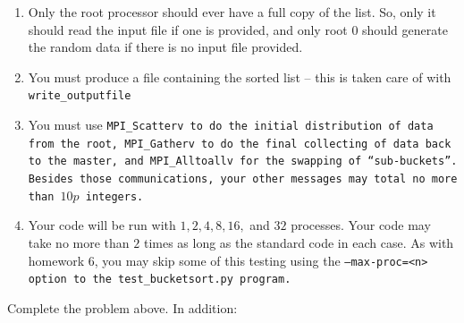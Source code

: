\documentclass{article}
\begin{document}
\begin{enumerate}
\begin{enumerate}
\item Only the root processor should ever have a full copy of the
  list.  So, only it should read the input file if one is provided,
  and only root 0 should generate the random data if there is no input
  file provided. 
\item You must produce a file containing the sorted list -- this is
  taken care of with \tt{write\_outputfile}

\item You must use \tt{MPI\_Scatterv} to do the initial distribution
  of data from the root,  \tt{MPI\_Gatherv} to do the final collecting
  of data back to the master, and
  \tt{MPI\_Alltoallv} for the swapping of ``sub-buckets''.  Besides
  those communications, your other messages may total no more than
  $10p$ integers. 

\item Your code will be run with $1,2,4,8,16,$ and $32$ processes.
  Your code may take no more than $2$ times as long as the standard
  code in each case.  As with homework 6, you may skip some of this
  testing using the \tt{--max-proc=<n>} option to the
  \tt{test\_bucketsort.py} program. 

\end{enumerate}




\end{enumerate}

\newpage


Complete the problem above.  In addition:
\end{document}

